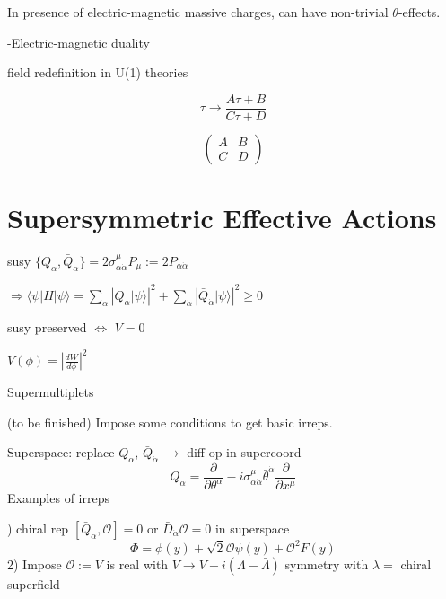 \documentclass[type = bachelor]{fduthesis-en}
\begin{document}
In presence of electric-magnetic massive charges, can have non-trivial $\theta$-effects.

\bigskip
-Electric-magnetic duality

field redefinition in U(1) theories

$$\tau\rightarrow\frac{A\tau+B}{C\tau+D}$$ 

\[
\left(
\begin{array}{cc}
A & B \\
C & D 
\end{array}
\right)
\] 

\section{Supersymmetric Effective Actions}
susy $\{Q_{\alpha},\bar{Q}_{\dot{\alpha}}\}=2\sigma^{\mu}_{\alpha\dot{\alpha}}P_{\mu}:=2P_{\alpha\dot{\alpha}}$

$\Rightarrow  \langle\psi|H|\psi\rangle = \sum_{\alpha}\left|Q_{\alpha}|\psi\rangle\right|^2+\sum_{\dot{\alpha}}\left|\bar{Q}_{\dot{\alpha}}|\psi\rangle\right|^2 \geq 0$

susy preserved $\Longleftrightarrow$ $V=0$ 


$V(\phi)=\left|\frac{dW}{d\phi}\right|^2$

\bigskip
Supermultiplets

(to be finished) Impose some conditions to get basic irreps.

Superspace: replace $Q_{\alpha}$, $\bar{Q}_{\dot{\alpha}}$ $\rightarrow$ diff op in supercoord
\begin{equation}
Q_{\alpha}=\frac{\partial}{\partial\theta^{\alpha}}-i\sigma^{\mu}_{\alpha\dot{\alpha}}\bar{\theta}^{\dot{\alpha}}\frac{\partial}{\partial x^{\mu}}
\end{equation}
\bigskip
Examples of irreps

) chiral rep $[\bar{Q}_{\dot{\alpha}}, \mathcal{O}]=0$ or $\bar{D}_{\dot{\alpha}}\mathcal{O}=0$ in superspace
\begin{equation}
\Phi = \phi(y)+\sqrt{2}\mathcal{O}\psi(y)+\mathcal{O}^2F(y)
\end{equation}
2) Impose $\mathcal{O}:=V$ is real with $V \rightarrow V+i(\Lambda-\bar{\Lambda})$ symmetry with $\lambda = $ chiral superfield
\end{document}
